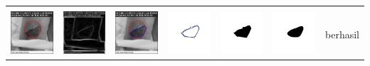 \begin{table}[H]
\begin{tabular}{|m{0.7in}|m{0.7in}|m{0.7in}|m{0.7in}|m{0.7in}|m{0.7in}|m{0.7in}|}
		&  &  & & & &  \\
		\includegraphics[width=0.7in]{dataset/dataset_3/luka_merah/ready/42_interp_init.jpg}&
		\includegraphics[width=0.7in]{dataset/dataset_3/luka_merah/ready/42_interp_ext.jpg}&
		\includegraphics[width=0.7in]{dataset/dataset_3/luka_merah/ready/42_interp_result.jpg}&
		\includegraphics[width=0.7in]{dataset/dataset_3/luka_merah/ready/42_gt_r.jpg}&
		\includegraphics[width=0.7in]{dataset/dataset_3/luka_merah/ready/42_r.jpg}&
		\includegraphics[width=0.7in]{dataset/dataset_3/luka_merah/ready/42_interp_r.jpg}&
		berhasil\\
		\hline
		

\end{tabular}
\end{table}
